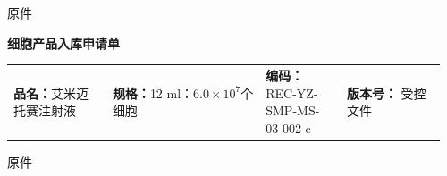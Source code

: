 \documentclass[UTF8,10pt,a4paper,fontset=fandol]{ctexart}
\newcommand{\fieldvalue}[1]{#1}
\begin{document}
\begin{center}
\fieldvalue{原件}
\end{center}

\begin{center}
\textbf{细胞产品入库申请单}
\end{center}

\noindent
\begin{tabular}{@{}p{0.22\linewidth}p{0.34\linewidth}p{0.18\linewidth}p{0.22\linewidth}@{}}
\textbf{品名：}艾米迈托赛注射液
&
\textbf{规格：}12 ml：$6.0\times10^{7}$个细胞
&
\textbf{编码：}
\fieldvalue{REC-YZ-SMP-MS-03-002-c}
&
\textbf{版本号：}
\fieldvalue{受控文件}
\end{tabular}

\begin{center}
\fieldvalue{原件}
\end{center}
\end{document}

